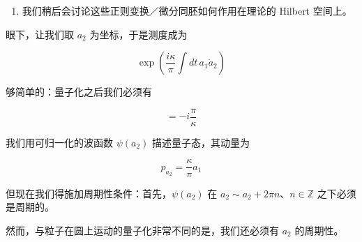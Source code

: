\begin{enumerate}
  一般地，若 $X$ 是光滑流形，可以在 $X$ 的全部微分同胚构成的群上赋予一个拓扑。这是一个无穷维（Banach）Lie 群。单位元的连通分支是正规子群，商群 $Diff(X)/Diff_0(X)$ 常被称为大微分同胚群。\footnote{更确切地说，大微分同胚是 $Diff(X)$ 中落到商群的非平凡元素上去的那些元素。} 在环面的情形，利用与万有覆盖之间的简单关系，可以证明 $Diff^+(T^2)/Diff^+_0(T^2)\cong SL(2,\mathbb{Z})$。

  {\small\itshape ［原文标记：$\clubsuit$这条评注现在与 2.2.12 节的材料重复了。$\clubsuit$］}

  \item 我们稍后会讨论这些正则变换／微分同胚如何作用在理论的 Hilbert 空间上。
\end{enumerate}

眼下，让我们取 $a_2$ 为坐标，于是测度成为

\begin{equation}
  \exp\left(\frac{i\kappa}{\pi}\int dt\,a_1\dot a_2\right)
  \tag{2.142}
  \label{eq:2.142}
\end{equation}

够简单的：量子化之后我们必须有

\begin{equation}
  [\hat a_1,\hat a_2]=-i\frac{\pi}{\kappa}
  \tag{2.143}
  \label{eq:2.143}
\end{equation}

我们用可归一化的波函数 $\psi(a_2)$ 描述量子态，其动量为

\begin{equation}
  p_{a_2}=\frac{\kappa}{\pi}a_1
  \tag{2.144}
  \label{eq:2.144}
\end{equation}

但现在我们得施加周期性条件：首先，$\psi(a_2)$ 在 $a_2\sim a_2+2\pi n$、$n\in\mathbb{Z}$ 之下必须是周期的。

然而，与粒子在圆上运动的量子化非常不同的是，我们还必须有 $a_2$ 的周期性。

